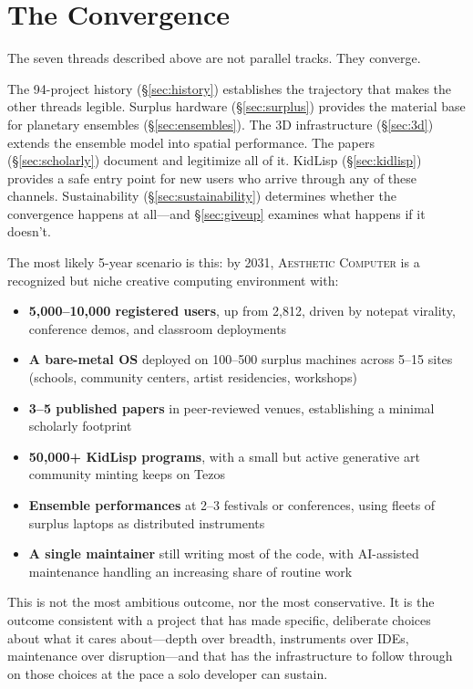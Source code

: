 \documentclass[10pt,letterpaper,twocolumn]{article}
\newcommand{\ac}{\textsc{Aesthetic Computer}}
\begin{document}

\section{The Convergence}
\label{sec:convergence}

The seven threads described above are not parallel tracks. They converge.

The 94-project history (\S\ref{sec:history}) establishes the trajectory that makes the other threads legible. Surplus hardware (\S\ref{sec:surplus}) provides the material base for planetary ensembles (\S\ref{sec:ensembles}). The 3D infrastructure (\S\ref{sec:3d}) extends the ensemble model into spatial performance. The papers (\S\ref{sec:scholarly}) document and legitimize all of it. KidLisp (\S\ref{sec:kidlisp}) provides a safe entry point for new users who arrive through any of these channels. Sustainability (\S\ref{sec:sustainability}) determines whether the convergence happens at all---and \S\ref{sec:giveup} examines what happens if it doesn't.

The most likely 5-year scenario is this: by 2031, \ac{} is a recognized but niche creative computing environment with:

\begin{itemize}
  \item \textbf{5,000--10,000 registered users}, up from 2,812, driven by notepat virality, conference demos, and classroom deployments
  \item \textbf{A bare-metal OS} deployed on 100--500 surplus machines across 5--15 sites (schools, community centers, artist residencies, workshops)
  \item \textbf{3--5 published papers} in peer-reviewed venues, establishing a minimal scholarly footprint
  \item \textbf{50,000+ KidLisp programs}, with a small but active generative art community minting keeps on Tezos
  \item \textbf{Ensemble performances} at 2--3 festivals or conferences, using fleets of surplus laptops as distributed instruments
  \item \textbf{A single maintainer} still writing most of the code, with AI-assisted maintenance handling an increasing share of routine work
\end{itemize}

This is not the most ambitious outcome, nor the most conservative. It is the outcome consistent with a project that has made specific, deliberate choices about what it cares about---depth over breadth, instruments over IDEs, maintenance over disruption---and that has the infrastructure to follow through on those choices at the pace a solo developer can sustain.
\end{document}
